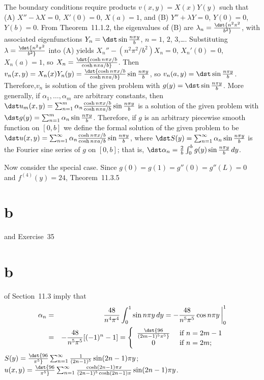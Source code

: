 \documentclass[dvips]{book}
\renewcommand{\exer}[1]{\par\medskip\;\noindent{\color{red}\bf #1.}}
\numberwithin{example}{section}
\numberwithin{equation}{section}
\numberwithin{theorem}{section}
\numberwithin{table}{section}
\numberwithin{figure}{section}
\newcommand{\lims}[2]{\,\bigg|_{#1}^{#2}}
\begin{document}
\exer{12.3.24}
The boundary conditions require products $v(x,y)=X(x)Y(y)$
such that
(A)  $X''-\lambda X=0$, $X'(0)=0$, $X(a)=1$, and
(B)  $Y''+\lambda Y=0$, $Y(0)=0$, $Y(b)=0$.
From Theorem~11.1.2, the eigenvalues of (B) are
$\lambda_n=\dst{n^2\pi^2\over b^2}$, with associated eigenfunctions
$Y_n=\dst\sin{n\pi y\over b}$, $n=1$, $2$, $3$,\dots.
Substituting $\lambda=\dst{n^2\pi^2\over b^2}$  into (A) yields
$X_n''-({n^2\pi^2/b^2})X_n=0$, $X_n'(0)=0$, $X_n(a)=1$, so
$X_n=\dst{\cosh n\pi x/b\over\cosh n\pi a/b}$. Then
$v_n(x,y)=X_n(x)Y_n(y)=\dst{\cosh n\pi x/b\over\cosh n\pi
a/b}\sin{n\pi y\over b}$, so
$v_n(a,y)=\dst\sin{n\pi y\over b}$.
Therefore,$v_n$ is solution of the given problem  with
$g(y)=\dst\sin{n\pi y\over b}$. More generally,
 if $\alpha_1,\dots,\alpha_m$ are arbitrary constants,
then
$\dst u_m(x,y)=\sum_{n=1}^m\alpha_n{\cosh n\pi x/b\over
\cosh n\pi a/b}
\sin{n\pi y\over b}$
 is a solution of the given problem with
$\dst g(y)=\sum_{n=1}^m\alpha_n\sin{n\pi y\over b}$.
Therefore, if $g$ is an arbitrary piecewise smooth function on
$[0,b]$  we define the formal solution of the given problem  to be
$\dst u(x,y)=\sum_{n=1}^\infty\alpha_n{\cosh n\pi x/b\over
\cosh n\pi a/b}
\sin{n\pi y\over b}$, where
$\dst S(y)=\sum_{n=1}^\infty \alpha_n\sin{n\pi y\over b}$
is the Fourier  sine series of $g$ on $[0,b]$; that is,
$\dst\alpha_n={2\over b}\int_0^b g(y)\sin
{n\pi y\over b}\,dy$.


Now consider the special case.
Since $g(0)=g(1)=g''(0)=g''(L)=0$ and $f^{(4)}(y)=24$,
Theorem~11.3.5\part{b} and Exercise~35\part{b} of
Section~11.3 imply that
\begin{eqnarray*}
\alpha_n&=&
{48\over n^4\pi^4}\int_0^1\sin n\pi y\,dy
=-{48\over n^5\pi^5}\cos n\pi y\lims01\\
&=&-{48\over n^5\pi^5}[(-1)^n-1]=
\left\{\begin{array}{cl}
\dst{96\over(2m-1)^5\pi^5}&\mbox{ if }n=2m-1\\
0&\mbox{ if } n=2m;
\end{array}
\right.
\end{eqnarray*}
$S(y)=\dst{96\over\pi^5}\sum_{n=1}^\infty{1\over(2n-1)^5}\sin(2n-1)\pi
y$;
$u(x,y)=\dst{96\over\pi^5}\sum_{n=1}^\infty{\cosh(2n-1)\pi x
\over(2n-1)^5\cosh(2n-1)\pi}\sin(2n-1)\pi y$.
\end{document}
